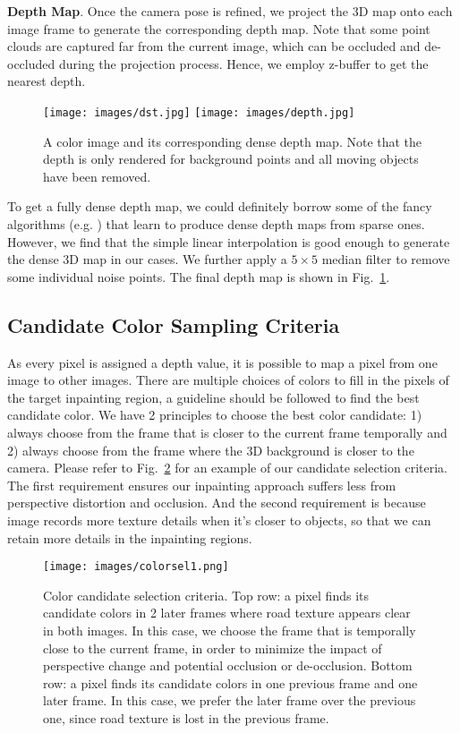 \documentclass[runningheads]{llncs}
\begin{document}
\textbf{Depth Map}. Once the camera pose is refined, we project the 3D map onto each image frame to generate the corresponding depth map. Note that some point clouds are captured far from the current image, which can be occluded and de-occluded during the projection process. Hence, we employ z-buffer to get the nearest depth.

\begin{figure}[t!]
\centering
\texttt{[image: images/dst.jpg]}
\texttt{[image: images/depth.jpg]}
   \caption{A color image and its corresponding dense depth map. Note that the depth is only rendered for background points and all moving objects have been removed.}
\label{fig:depthmap}
\end{figure}

To get a fully dense depth map, we could definitely borrow some of the fancy algorithms (e.g. \cite{cheng2018depth}) that learn to produce dense depth maps from sparse ones. However, we find that the simple linear interpolation is good enough to generate the dense 3D map in our cases. We further apply a $5\times5$ median filter to remove some individual noise points. The final depth map is shown in Fig.~\ref{fig:depthmap}.


\subsection{Candidate Color Sampling Criteria}

As every pixel is assigned a depth value, it is possible to map a pixel from one image to other images. There are multiple choices of colors to fill in the pixels of the target inpainting region, a guideline should be followed to find the best candidate color. We have 2 principles to choose the best color candidate: 1) always choose from the frame that is closer to the current frame temporally and 2) always choose from the frame where the 3D background is closer to the camera. Please refer to Fig.~\ref{fig:colorsel} for an example of our candidate selection criteria. The first requirement ensures our inpainting approach suffers less from perspective distortion and occlusion. And the second requirement is because image records more texture details when it's closer to objects, so that we can retain more details in the inpainting regions.

\begin{figure}[t!]
\centering
\texttt{[image: images/colorsel1.png]}
   \caption{Color candidate selection criteria. Top row: a pixel finds its candidate colors in 2 later frames where road texture appears clear in both images. In this case, we choose the frame that is temporally close to the current frame, in order to minimize the impact of perspective change and potential occlusion or de-occlusion. Bottom row: a pixel finds its candidate colors in one previous frame and one later frame. In this case, we prefer the later frame over the previous one, since road texture is lost in the previous frame.}
\label{fig:colorsel}
\end{figure}
\end{document}
